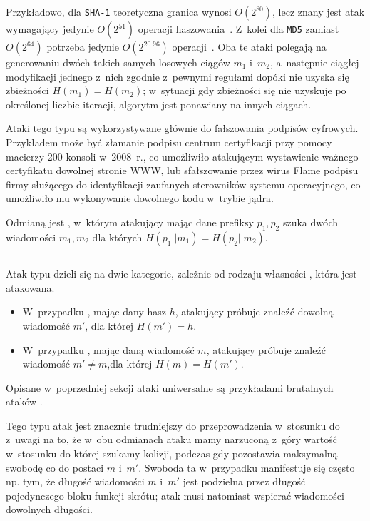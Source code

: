 Przykładowo, dla \texttt{SHA-1} teoretyczna granica wynosi $O(2^{80})$, lecz
znany jest atak wymagający jedynie $O(2^{51})$ operacji
haszowania~\cite{best_sha1_collision_attack}. Z~kolei dla \texttt{MD5} zamiast
$O(2^{64})$ potrzeba jedynie $O(2^{20.96})$
operacji~\cite{best_md5_collision_attack}. Oba te ataki polegają na generowaniu
dwóch takich samych losowych ciągów $m_1$ i~$m_2$, a~następnie ciągłej
modyfikacji jednego z~nich zgodnie z~pewnymi regułami dopóki nie uzyska się
zbieżności $H(m_1) = H(m_2)$; w~sytuacji gdy zbieżności się nie uzyskuje po
określonej liczbie iteracji, algorytm jest ponawiany na innych ciągach.

Ataki tego typu są wykorzystywane głównie do fałszowania podpisów cyfrowych.
Przykładem może być złamanie podpisu centrum certyfikacji przy pomocy macierzy
200 konsoli  w~2008~r.\cite{ps3_attack}, co umożliwiło
atakującym wystawienie ważnego certyfikatu dowolnej stronie WWW, lub
sfałszowanie przez wirus Flame podpisu firmy  służącego do
identyfikacji zaufanych sterowników systemu operacyjnego\cite{flame_attack}, co
umożliwiło mu wykonywanie dowolnego kodu w~trybie jądra.

Odmianą  jest ,
w~którym atakujący mając dane prefiksy $p_1, p_2$ szuka dwóch wiadomości $m_1,
m_2$ dla których $H(p_1 || m_1) = H(p_2 || m_2)$.


\subsection{}
Atak typu  dzieli się na dwie kategorie, zależnie od rodzaju
własności , która jest atakowana.
    \begin{itemize}

    \item W~przypadku , mając dany hasz $h$, atakujący
    próbuje znaleźć dowolną wiadomość $m'$, dla której $H(m') = h$.

    \item W~przypadku , mając daną wiadomość $m$,
    atakujący próbuje znaleźć wiadomość $m' \neq m$,dla której $H(m) = H(m')$.

    \end{itemize}
Opisane w~poprzedniej sekcji ataki uniwersalne są przykładami
brutalnych ataków .

Tego typu atak jest znacznie trudniejszy do przeprowadzenia w~stosunku do
 z~uwagi na to, że w~obu odmianach ataku mamy narzuconą
z~góry wartość w~stosunku do której szukamy kolizji, podczas gdy  pozostawia maksymalną swobodę co do postaci $m$ i~$m'$. Swoboda ta
w~przypadku  manifestuje się często np. tym, że długość
wiadomości $m$ i~$m'$ jest podzielna przez długość pojedynczego bloku funkcji
skrótu; atak  musi natomiast wspierać wiadomości dowolnych
długości.

